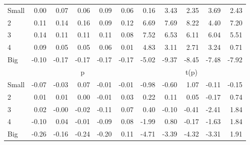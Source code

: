 \begin{table}[!ht]
\begin{tabular}{lrrrrrrrrrr}
    \\
      \cmidrule(r){2-6} \cmidrule(r){7-11}

    Small   & 0.00  & 0.07  & 0.06  & 0.09  & 0.06  & 0.16  & 3.43  & 2.35  & 3.69  & 2.43  \\
         2  & 0.11  & 0.14  & 0.16  & 0.09  & 0.12  & 6.69  & 7.69  & 8.22  & 4.40  & 7.20  \\
         3  & 0.14  & 0.11  & 0.11  & 0.11  & 0.08  & 7.52  & 6.53  & 6.11  & 6.04  & 5.51  \\
         4  & 0.09  & 0.05  & 0.05  & 0.06  & 0.01  & 4.83  & 3.11  & 2.71  & 3.24  & 0.71  \\
    Big     & -0.10  & -0.17  & -0.17  & -0.17  & -0.17  & -5.02  & -9.37  & -8.45  & -7.48  & -7.92  \\

  
    
      & \multicolumn{5}{c}{p} & \multicolumn{5}{c}{t(p)}
    
    \\
      \cmidrule(r){2-6} \cmidrule(r){7-11}

    Small   & -0.07  & -0.03  & 0.07  & -0.01  & -0.01  & -0.98  & -0.60  & 1.07  & -0.11  & -0.15  \\
         2  & 0.01  & 0.01  & 0.00  & -0.01  & 0.03  & 0.22  & 0.11  & 0.05  & -0.17  & 0.74  \\
         3  & 0.02  & -0.00  & -0.02  & -0.11  & 0.07  & 0.40  & -0.10  & -0.41  & -2.41  & 1.84  \\
         4  & -0.10  & 0.04  & -0.01  & -0.09  & 0.08  & -1.99  & 0.80  & -0.17  & -1.63  & 1.84  \\
    Big     & -0.26  & -0.16  & -0.24  & -0.20  & 0.11  & -4.71  & -3.39  & -4.32  & -3.31  & 1.91  \\

  

  \bottomrule
\end{tabular}
\label{tbl:25_Size_BM_B2016}
\end{table}